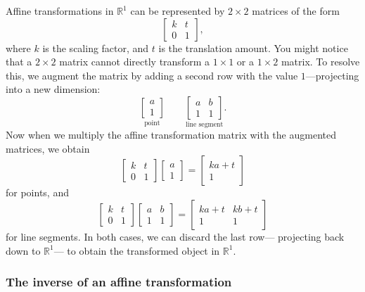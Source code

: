 Affine transformations in \(\mathbb{R}^{1}\) can be represented
by \(2\times2\) matrices of the form
\[
    \begin{bmatrix}
        k & t \\
        0 & 1
    \end{bmatrix},
\]
where \(k\) is the scaling factor, and \(t\) is the translation amount.
You might notice that a \(2\times2\) matrix cannot directly transform
a \(1\times1\) or a \(1\times2\) matrix. To resolve this, we augment 
the matrix by adding a second row with the value \(1\)---projecting  
into a new dimension:
\[
    \underset{\mbox{point}}{
        \begin{bmatrix}
            a \\
            1
        \end{bmatrix}
    }
    \qquad
    \underset{\mbox{line segment}}{
        \begin{bmatrix}
            a & b \\
            1 & 1
        \end{bmatrix}
    }.
\]
Now when we multiply the affine transformation matrix with the
augmented matrices, we obtain
\[
    \begin{bmatrix}
        k & t \\
        0 & 1
    \end{bmatrix}
    \begin{bmatrix}
        a \\
        1
    \end{bmatrix}
    =
    \begin{bmatrix}
        ka + t \\
        1
    \end{bmatrix}
\]
for points, and
\[
    \begin{bmatrix}
        k & t \\
        0 & 1
    \end{bmatrix}
    \begin{bmatrix}
        a & b \\
        1 & 1
    \end{bmatrix}
    =
    \begin{bmatrix}
        ka + t & kb + t \\
        1 & 1
    \end{bmatrix}
\]
for line segments. In both cases, we can discard the last row---%
projecting back down to \(\mathbb{R}^1\)---%
to obtain the transformed object in \(\mathbb{R}^{1}\).

\subsubsection{The inverse of an affine transformation}

